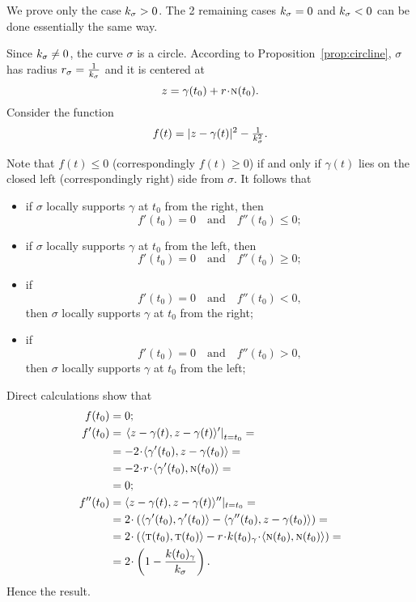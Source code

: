 
We prove only the case $k_\sigma>0$.
The 2 remaining cases $k_\sigma=0$ and $k_\sigma<0$ can be done essentially the same way.

Since $k_\sigma\ne0$, the curve $\sigma$ is a circle.
According to Proposition~\ref{prop:circline},
$\sigma$ has radius $r_\sigma=\tfrac1{k_\sigma}$ and it is centered at 
\[z=\gamma(t_0)+r\cdot\norm(t_0).\]
Consider the function 
\[f(t)=|z-\gamma(t)|^2-\tfrac1{k_\sigma^2}.\]

Note that $f(t)\le0$ (correspondingly $f(t)\ge0$) 
if and only if $\gamma(t)$ lies on the closed left (correspondingly right) side from $\sigma$.
It follows that 
\begin{itemize}
\item if $\sigma$ locally supports $\gamma$ at $t_0$ from the right, 
then
\[f'(t_0)=0\quad\text{and}\quad f''(t_0)\le 0;\]

\item if $\sigma$ locally supports $\gamma$ at $t_0$ from  the left, 
then 
\[f'(t_0)=0\quad\text{and}\quad f''(t_0)\ge 0;\]

\item if 
\[f'(t_0)=0\quad\text{and}\quad f''(t_0)< 0,\]
then $\sigma$ locally supports $\gamma$ at $t_0$ from  the right;

\item if 
\[f'(t_0)=0\quad\text{and}\quad f''(t_0)> 0,\] then $\sigma$ locally supports $\gamma$ at $t_0$ from  the left;
\end{itemize}

Direct calculations show that
\begin{align*}
f(t_0)&=0;
\\
f'(t_0)&=\left.\langle z-\gamma(t),z-\gamma(t) \rangle'\right|_{t=t_0}=
\\
&=-2\cdot \langle \gamma'(t_0),z-\gamma(t_0) \rangle=
\\&=-2\cdot r\cdot \langle \gamma'(t_0),\norm(t_0) \rangle=
\\
&=0;
\\
f''(t_0)&=\langle z-\gamma(t),z-\gamma(t) \rangle''|_{t=t_0}=
\\
&=2\cdot\left( \langle \gamma'(t_0),\gamma'(t_0) \rangle-\langle \gamma''(t_0),z-\gamma(t_0) \rangle \right)=
\\
&=2\cdot\left( \langle \tan(t_0),\tan(t_0) \rangle-r\cdot\skur(t_0)_\gamma\cdot \langle \norm(t_0),\norm(t_0) \rangle \right)=
\\
&=2\cdot\left(1- \frac{\skur(t_0)_\gamma}{\skur_\sigma}\right).
\end{align*}
Hence the result.\qeds


